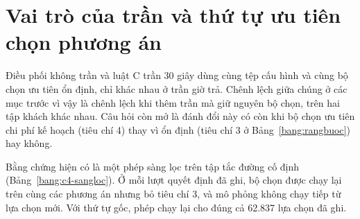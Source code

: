 
\section{Vai trò của trần và thứ tự ưu tiên chọn phương án}
\label{muc:c4-vaitro}

Điều phối không trần và luật C trần 30 giây dùng cùng tệp cấu hình và cùng bộ chọn ưu tiên ổn định, chỉ khác nhau
ở trần giờ trả. Chênh lệch giữa chúng ở các mục trước vì vậy là chênh lệch khi thêm trần mà giữ nguyên bộ chọn, trên
hai tập khách khác nhau. Câu hỏi còn mở là đánh đổi này có còn khi bộ chọn ưu tiên chi phí kế hoạch (tiêu chí 4) thay
vì ổn định (tiêu chí 3 ở Bảng~\ref{bang:rangbuoc}) hay không.

Bằng chứng hiện có là một phép sàng lọc trên tập tắc đường cố định (Bảng~\ref{bang:c4-sangloc}). Ở mỗi lượt quyết
định đã ghi, bộ chọn được chạy lại trên cùng các phương án nhưng bỏ tiêu chí 3, và mô phỏng không chạy tiếp từ lựa
chọn mới. Với thứ tự gốc, phép chạy lại cho đúng cả 62.837 lựa chọn đã ghi.


